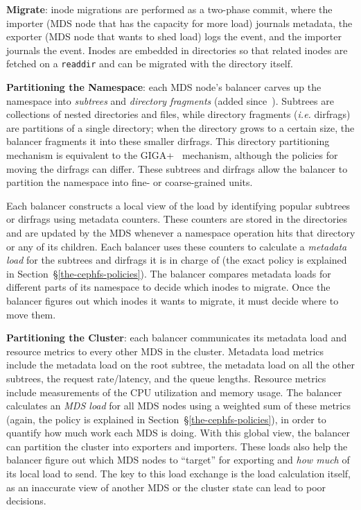 \textbf{Migrate}: inode migrations are performed as a two-phase commit, where the importer (MDS node that has the capacity for more load) journals metadata, the exporter (MDS node that wants to shed load) logs the event, and the importer journals the event. Inodes are embedded in directories so that related inodes are fetched on a \texttt{readdir} and can be migrated with the directory itself.

\textbf{Partitioning the Namespace}: each MDS node's balancer carves up the namespace into {\it subtrees} and {\it directory fragments} (added since~\cite{weil:sc2004-dyn-metadata,weil:osdi2006-ceph}). Subtrees are collections of nested directories and files, while directory fragments ({\it i.e.} dirfrags) are partitions of a single directory; when the directory grows to a certain size, the balancer fragments it into these smaller dirfrags. This directory partitioning mechanism is equivalent to the GIGA+~\cite{patil:fast2011-giga+} mechanism, although the policies for moving the dirfrags can differ.  These subtrees and dirfrags allow the balancer to  partition the namespace into fine- or coarse-grained units.

Each balancer constructs a local view of the load by identifying popular subtrees or dirfrags using metadata counters. These counters are stored in the directories and are updated by the MDS whenever a namespace operation hits that directory or any of its children. Each balancer uses these counters to calculate a {\it metadata load} for the subtrees and dirfrags it is in charge of (the exact policy is explained in Section~\S\ref{the-cephfs-policies}). The balancer compares metadata loads for different parts of its namespace to decide which inodes to migrate. Once the balancer figures out which inodes it wants to migrate, it must decide where to move them.

\textbf{Partitioning the Cluster}: each balancer communicates its metadata load and resource metrics to every other MDS in the cluster. Metadata load metrics include the metadata load on the root subtree, the metadata load on all the other subtrees, the request rate/latency, and the queue lengths. Resource metrics include measurements of the CPU utilization and memory usage. The balancer calculates an {\it MDS load} for all MDS nodes using a weighted sum of these metrics (again, the policy is explained in Section~\S\ref{the-cephfs-policies}), in order to quantify how much work each MDS is doing. With this global view, the balancer can partition the cluster into exporters and importers. These loads also help the balancer figure out which MDS nodes to ``target'' for exporting and {\it how much} of its local load to send. The key to this load exchange is the load calculation itself, as an inaccurate view of another MDS or the cluster state can lead to poor decisions.

